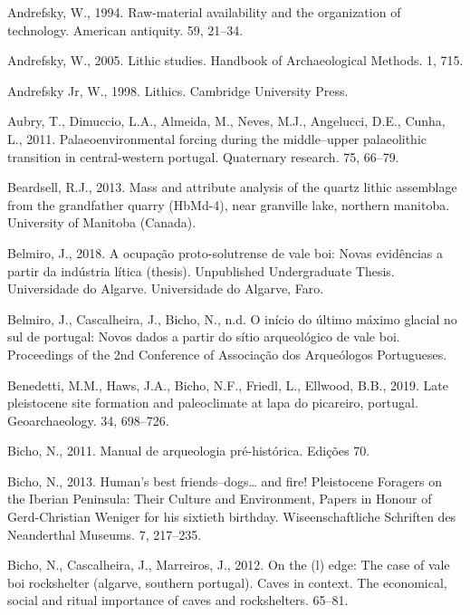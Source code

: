 \documentclass[12pt,twoside]{reedthesis}
\begin{document}
\leavevmode\hypertarget{ref-andrefsky1994}{}%
Andrefsky, W., 1994. Raw-material availability and the organization of technology. American antiquity. 59, 21--34.

\leavevmode\hypertarget{ref-andrefsky2005}{}%
Andrefsky, W., 2005. Lithic studies. Handbook of Archaeological Methods. 1, 715.

\leavevmode\hypertarget{ref-andrefsky1998}{}%
Andrefsky Jr, W., 1998. Lithics. Cambridge University Press.

\leavevmode\hypertarget{ref-aubryetal2011}{}%
Aubry, T., Dimuccio, L.A., Almeida, M., Neves, M.J., Angelucci, D.E., Cunha, L., 2011. Palaeoenvironmental forcing during the middle--upper palaeolithic transition in central-western portugal. Quaternary research. 75, 66--79.

\leavevmode\hypertarget{ref-beardsell2013}{}%
Beardsell, R.J., 2013. Mass and attribute analysis of the quartz lithic assemblage from the grandfather quarry (HbMd-4), near granville lake, northern manitoba. University of Manitoba (Canada).

\leavevmode\hypertarget{ref-belmiro2018}{}%
Belmiro, J., 2018. A ocupação proto-solutrense de vale boi: Novas evidências a partir da indústria lítica (thesis). Unpublished Undergraduate Thesis. Universidade do Algarve. Universidade do Algarve, Faro.

\leavevmode\hypertarget{ref-belmiro2017}{}%
Belmiro, J., Cascalheira, J., Bicho, N., n.d. O início do último máximo glacial no sul de portugal: Novos dados a partir do sítio arqueológico de vale boi. Proceedings of the 2nd Conference of Associação dos Arqueólogos Portugueses.

\leavevmode\hypertarget{ref-benedettietal2019}{}%
Benedetti, M.M., Haws, J.A., Bicho, N.F., Friedl, L., Ellwood, B.B., 2019. Late pleistocene site formation and paleoclimate at lapa do picareiro, portugal. Geoarchaeology. 34, 698--726.

\leavevmode\hypertarget{ref-bicho2011}{}%
Bicho, N., 2011. Manual de arqueologia pré-histórica. Edições 70.

\leavevmode\hypertarget{ref-bicho2013}{}%
Bicho, N., 2013. Human's best friends--dogs\ldots{} and fire! Pleistocene Foragers on the Iberian Peninsula: Their Culture and Environment, Papers in Honour of Gerd-Christian Weniger for his sixtieth birthday. Wiseenschaftliche Schriften des Neanderthal Museums. 7, 217--235.

\leavevmode\hypertarget{ref-bichoetal2012}{}%
Bicho, N., Cascalheira, J., Marreiros, J., 2012. On the (l) edge: The case of vale boi rockshelter (algarve, southern portugal). Caves in context. The economical, social and ritual importance of caves and rockshelters. 65--81.
\end{document}
